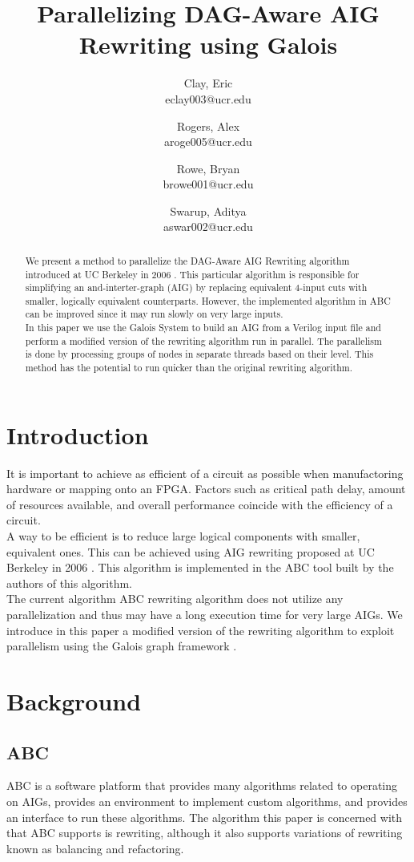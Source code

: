 \documentclass[twocolumn]{article}
\title{\huge{Parallelizing DAG-Aware AIG Rewriting using Galois}}
\date{\vspace{-5ex}}
\author{
  Clay, Eric\\
  eclay003@ucr.edu
  \and
  Rogers, Alex\\
  aroge005@ucr.edu
  \and
  Rowe, Bryan\\
  browe001@ucr.edu
  \and
  Swarup, Aditya\\
  aswar002@ucr.edu
}
\begin{document}
\maketitle

\begin{abstract}
We present a method to parallelize the DAG-Aware AIG Rewriting algorithm introduced at UC Berkeley in 2006 \cite{DAG}.  This particular algorithm is responsible for simplifying an and-interter-graph (AIG) by replacing equivalent 4-input cuts with smaller, logically equivalent counterparts.  However, the implemented algorithm in ABC\cite{DAG} can be improved since it may run slowly on very large inputs.\\\indent
In this paper we use the Galois System\cite{GALOIS} to build an AIG from a Verilog input file and perform a modified version of the rewriting algorithm run in parallel.  The parallelism is done by processing groups of nodes in separate threads based on their level.  This method has the potential to run quicker than the original rewriting algorithm.
\end{abstract}

\section{Introduction}
It is important to achieve as efficient of a circuit as possible when manufactoring hardware or mapping onto an FPGA.  Factors such as critical path delay, amount of resources available, and overall performance coincide with the efficiency of a circuit.\\\indent
A way to be efficient is to reduce large logical components with smaller, equivalent ones.  This can be achieved using AIG rewriting proposed at UC Berkeley in 2006 \cite{DAG}.  This algorithm is implemented in the ABC tool built by the authors of this algorithm.\\\indent
The current algorithm ABC rewriting algorithm does not utilize any parallelization and thus may have a long execution time for very large AIGs.  We introduce in this paper a modified version of the rewriting algorithm to exploit parallelism using the Galois graph framework \cite{GALOIS}.

\section{Background}
\subsection{ABC}
ABC is a software platform that provides many algorithms related to operating on AIGs, provides an environment to implement custom algorithms, and provides an interface to run these algorithms.  The algorithm this paper is concerned with that ABC supports is rewriting, although it also supports variations of rewriting known as balancing and refactoring.
\end{document}

